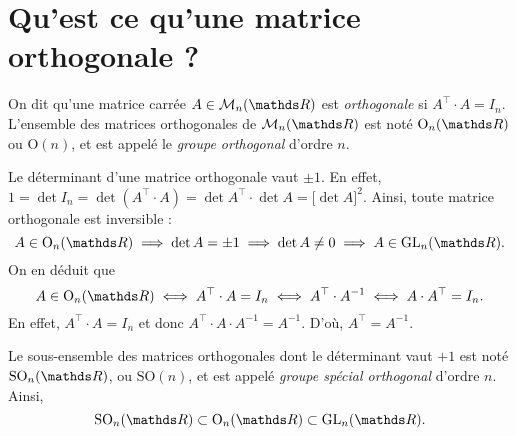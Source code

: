 \section{Qu'est ce qu'une matrice orthogonale ?}

\begin{defn}
  On dit qu'une matrice carrée $A \in \mathcal{M}_n(\R)$\/ est \textit{orthogonale} si $A^\top \cdot A = I_n$.
  L'ensemble des matrices orthogonales de $\mathcal{M}_n(\R)$\/ est noté $\mathrm{O}_n(\R)$\/ ou $\mathrm{O}(n)$, et est appelé le \textit{groupe orthogonal} d'ordre $n$.
\end{defn}

\begin{rmk}
  Le déterminant d'une matrice orthogonale vaut $\pm 1$. En effet, $1 = \det I_n = \det(A^\top \cdot A) = \det A^\top \cdot \det A = \big[\!\det A\big]^2$.
  Ainsi, toute matrice orthogonale est inversible : \[
    A \in \mathrm{O}_n(\R) \implies \det A = \pm 1 \implies\det A \neq 0 \implies A \in \mathrm{GL}_n(\R)
  .\]
  On en déduit que \[
    A \in \mathrm{O}_n(\R) \iff A^\top \cdot A = I_n \iff A^\top \cdot A^{-1} \iff A \cdot A^\top = I_n
  .\] En effet, $A^\top \cdot A = I_n$\/ et donc $A^\top \cdot A\cdot A^{-1} = A^{-1}$. D'où, $A^\top = A^{-1}$.

  Le sous-ensemble des matrices orthogonales dont le déterminant vaut $+1$\/ est noté $\mathrm{SO}_n(\R)$, ou $\mathrm{SO}(n)$, et est appelé \textit{groupe spécial orthogonal} d'ordre $n$. Ainsi, \[
    \mathrm{SO}_n(\R) \subset \mathrm{O}_n(\R) \subset \mathrm{GL}_n(\R)
  .\]
\end{rmk}

